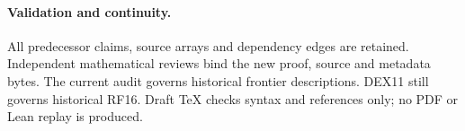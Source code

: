 \paragraph{Validation and continuity.}
All predecessor claims, source arrays and dependency edges are
retained. Independent mathematical reviews bind the new proof,
source and metadata bytes. The current audit governs historical
frontier descriptions. DEX11 still governs historical RF16.
Draft TeX checks syntax and references only; no PDF or Lean
replay is produced.
